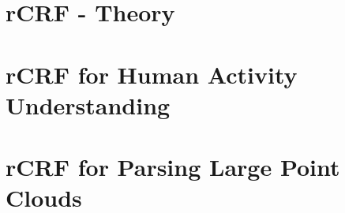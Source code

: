 \section{rCRF - Theory}
\section{rCRF for Human Activity Understanding}
\section{rCRF for Parsing Large Point Clouds}
